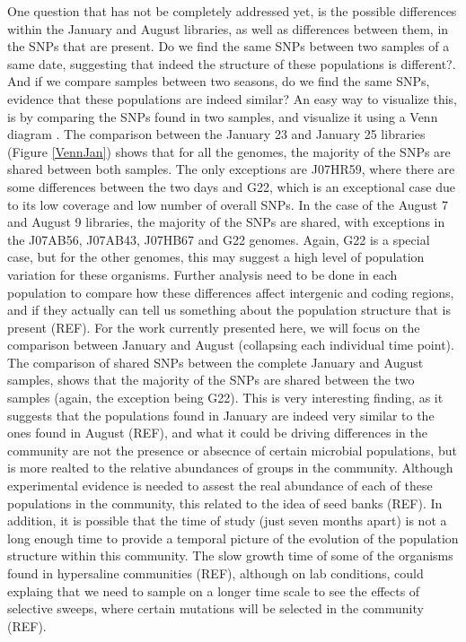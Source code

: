 One question that has not be completely addressed yet, is the possible differences within the January and August libraries, as well as differences between them, in the SNPs that are present. Do we find the same SNPs between two samples of a same date, suggesting that indeed the structure of these populations is different?. And if we compare samples between two seasons, do we find the same SNPs, evidence that these populations are indeed similar? An easy way to visualize this, is by comparing the SNPs found in two samples, and visualize it using a Venn diagram \cite{Pabinger:2014dl}. The comparison between the January 23 and January 25 libraries (Figure \ref{VennJan}) shows that for all the genomes, the majority of the SNPs are shared between both samples. The only exceptions are J07HR59, where there are some differences between the two days and G22, which is an exceptional case due to its low coverage and low number of overall SNPs. In the case of the August 7 and August 9 libraries, the majority of the SNPs are shared, with exceptions in the J07AB56, J07AB43, J07HB67 and G22 genomes. Again, G22 is a special case, but for the other genomes, this may suggest a high level of population variation for these organisms. Further analysis need to be done in each population to compare how these differences affect intergenic and coding regions, and if they actually can tell us something about the population structure that is present (REF). For the work currently presented here, we will focus on the comparison between January and August (collapsing each individual time point). The comparison of shared SNPs between the complete January and August samples, shows that the majority of the SNPs are shared between the two samples (again, the exception being G22). This is very interesting finding, as it suggests that the populations found in January are indeed very similar to the ones found in August (REF), and what it could be driving differences in the community are not the presence or absecnce of certain microbial populations, but is more realted to the relative abundances of groups in the community. Although experimental evidence is needed to assest the real abundance of each of these populations in the community, this related to the idea of seed banks (REF). In addition, it is possible that the time of study (just seven months apart) is not a long enough time to provide a temporal picture of the evolution of the population structure within this community. The slow growth time of some of the organisms found in hypersaline communities (REF), although on lab conditions, could explaing that we need to sample on a longer time scale to see the effects of selective sweeps, where certain mutations will be selected in the community (REF).

